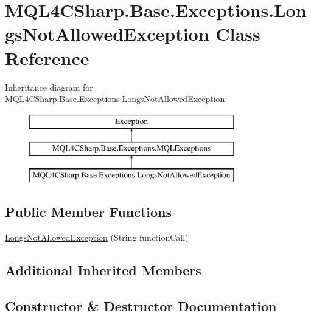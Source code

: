 \hypertarget{class_m_q_l4_c_sharp_1_1_base_1_1_exceptions_1_1_longs_not_allowed_exception}{}\section{M\+Q\+L4\+C\+Sharp.\+Base.\+Exceptions.\+Longs\+Not\+Allowed\+Exception Class Reference}
\label{class_m_q_l4_c_sharp_1_1_base_1_1_exceptions_1_1_longs_not_allowed_exception}
Inheritance diagram for M\+Q\+L4\+C\+Sharp.\+Base.\+Exceptions.\+Longs\+Not\+Allowed\+Exception\+:\begin{figure}[H]
\begin{center}
\leavevmode
\includegraphics[height=3.000000cm]{class_m_q_l4_c_sharp_1_1_base_1_1_exceptions_1_1_longs_not_allowed_exception}
\end{center}
\end{figure}
\subsection*{Public Member Functions}
\begin{DoxyCompactItemize}
\item 
\hyperlink{class_m_q_l4_c_sharp_1_1_base_1_1_exceptions_1_1_longs_not_allowed_exception_a371951ec7936f968b8659778b3e99fef}{Longs\+Not\+Allowed\+Exception} (String function\+Call)
\end{DoxyCompactItemize}
\subsection*{Additional Inherited Members}


\subsection{Constructor \& Destructor Documentation}

